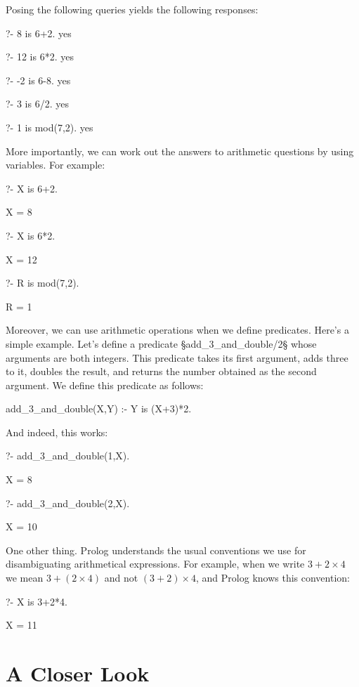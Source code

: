 Posing the following queries yields the following responses:

\begin{LPNcodedisplay}
?- 8 is 6+2.
yes

?- 12 is 6*2.
yes

?- -2 is 6-8.
yes

?- 3 is 6/2.
yes

?- 1 is mod(7,2).
yes
\end{LPNcodedisplay}


More importantly, we can work out the answers to arithmetic questions
by using variables.  For example:

\begin{LPNcodedisplay}
?- X is 6+2.

X = 8

?- X is 6*2.

X = 12

?- R is mod(7,2).

R = 1
\end{LPNcodedisplay}

Moreover, we can use arithmetic operations when we define predicates.
Here's a simple example.  Let's define a predicate
§add_3_and_double/2§ whose arguments are both integers.  This
predicate takes its first argument, adds three to it, doubles the
result, and returns the number obtained as the second argument.  We
define this predicate as follows:
\begin{LPNcodedisplay}
add_3_and_double(X,Y) :- Y is (X+3)*2.
\end{LPNcodedisplay}
And indeed, this works:
\begin{LPNcodedisplay}
?- add_3_and_double(1,X).

X = 8

?- add_3_and_double(2,X).

X = 10
\end{LPNcodedisplay}


One other thing.  Prolog understands the usual conventions we use for
disambiguating arithmetical expressions.  For example, when we write
$3+2\times 4$ we mean $3+(2\times 4)$ and not $(3+2)\times 4$, and
Prolog knows this convention:
\begin{LPNcodedisplay}
?- X is 3+2*4.

X = 11
\end{LPNcodedisplay}





\section{A Closer Look}\label{SEC.L5.LOOK}

